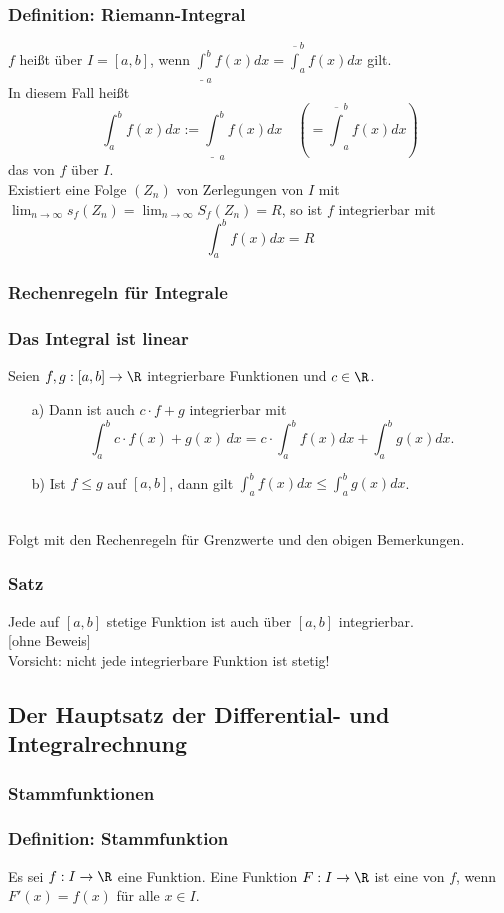 %
\begin{frame}\frametitle{Definition: Riemann-Integral}
$f$ heißt  über $I=[a,b]$, wenn $\underline{\int}_{a}^b f(x)dx = \overline{\int}_a^{b} f(x)dx$ gilt.\\
In diesem Fall heißt 
$$
\int_a^b f(x) dx := \underline{\int}_{a}^b f(x)dx \quad \left(= \overline{\int}_a^{b} f(x)dx \right)
$$
das  von $f$ über $I$.
\vfill
\pause
{}\\
Existiert eine Folge $(Z_n)$ von Zerlegungen von $I$ mit $\lim_{n\to \infty}s_f(Z_n)=\lim_{n\to \infty}S_f(Z_n)=R$, so ist $f$ integrierbar mit 
$$
\int_a^b f(x)dx=R
$$
\end{frame}
%
\subsubsection{Rechenregeln für Integrale}
%
\begin{frame}\frametitle{Das Integral ist linear}
	Seien $f,g: [a,b] \to\R$ integrierbare Funktionen und $c\in\R$.
	\vspace{5mm}
	\begin{itemize}
	\item[a)]
	Dann ist auch $c\cdot f+ g$ integrierbar mit
	$$
		\int_{a}^{b}c\cdot f(x)+g(x)\, dx = c\cdot \int_{a}^{b}f(x)dx + \int_{a}^{b}g(x)dx. 
	$$
	\item[b)] Ist $f\le g$ auf $[a,b]$, dann gilt $\int_a^b f(x)dx \le \int_a^b g(x)dx$.
	\end{itemize}
	\vspace{5mm}
	\\
Folgt mit den Rechenregeln für Grenzwerte und den obigen Bemerkungen.
\end{frame}
%
%
\begin{frame}\frametitle{Satz}
Jede auf $[a,b]$ stetige Funktion ist auch über $[a,b]$ integrierbar.\\
\vspace{5mm}
[ohne Beweis]\pause
\vfill
{}\\
Vorsicht: nicht jede integrierbare Funktion ist stetig!
\end{frame}
%
\subsection{Der Hauptsatz der Differential- und Integralrechnung}
\makeSectionDividerPage
%
\subsubsection{Stammfunktionen}
%
\begin{frame}\frametitle{Definition: Stammfunktion}
Es sei $f: I \to \R$ eine Funktion. Eine Funktion $F: I \to \R$ ist eine  von $f$, wenn $F'(x)=f(x)$ für alle $x \in I$.
\end{frame}
%
